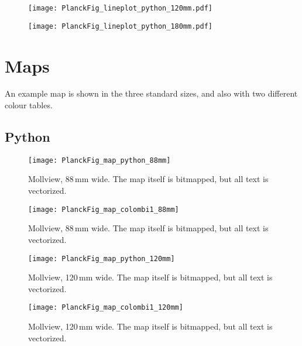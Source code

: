 \documentclass[traditabstract]{aa}
\begin{document}
\begin{figure*}[h]
\sidecaption
\texttt{[image: PlanckFig\_lineplot\_python\_120mm.pdf]}
\caption{\fcaption}
\end{figure*}

\begin{figure*}[t]
\texttt{[image: PlanckFig\_lineplot\_python\_180mm.pdf]}
\caption{\fcaption}
\end{figure*}

\clearpage











\section{Maps}

An example map is shown in the three standard sizes, and also with two different colour tables.


\subsection{Python}


\begin{figure}[h]
\texttt{[image: PlanckFig\_map\_python\_88mm]}
\caption{\label{fig:gainCurve} Mollview, 88\,mm wide.  The map itself is bitmapped, but all text is vectorized.} 
\end{figure}

\begin{figure}[h]
\texttt{[image: PlanckFig\_map\_colombi1\_88mm]}
\caption{\label{fig:gainCurve} Mollview, 88\,mm wide.  The map itself is bitmapped, but all text is vectorized.} 
\end{figure}



\begin{figure*}[h]
\sidecaption
\texttt{[image: PlanckFig\_map\_python\_120mm]}
\caption{\label{fig:gainCurve} Mollview, 120\,mm wide.  The map itself is bitmapped, but all text is vectorized.} 
\end{figure*}

\begin{figure*}[h]
\sidecaption
\texttt{[image: PlanckFig\_map\_colombi1\_120mm]}
\caption{\label{fig:gainCurve} Mollview, 120\,mm wide.  The map itself is bitmapped, but all text is vectorized.} 
\end{figure*}
\end{document}
